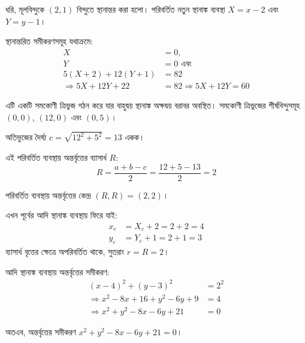\documentclass[12pt, a4paper]{article}
\begin{document}
\begin{tcolorbox}[solutionbox={সমাধান (Solution)}]
    \noindent
    ধরি, মূলবিন্দুকে $(2, 1)$ বিন্দুতে স্থানান্তর করা হলো। পরিবর্তিত নতুন স্থানাঙ্ক ব্যবস্থা $X = x - 2$ এবং $Y = y - 1$। 
    
    \vspace{0.5em}
    স্থানান্তরিত সমীকরণসমূহ যথাক্রমে: 
    \begin{align*}
        X &= 0, \\
        Y &= 0 \text{ এবং } \\
        5(X + 2) + 12(Y + 1) &= 82 \\
        \Rightarrow 5X + 12Y + 22 &= 82 \Rightarrow 5X + 12Y = 60
    \end{align*}
    
    \vspace{0.5em}
    এটি একটি সমকোণী ত্রিভুজ গঠন করে যার বাহুদ্বয় স্থানাঙ্ক অক্ষদ্বয় বরাবর অবস্থিত। সমকোণী ত্রিভুজের শীর্ষবিন্দুসমূহ $(0, 0)$, $(12, 0)$ এবং $(0, 5)$।
    
    \vspace{0.5em}
    অতিভুজের দৈর্ঘ্য $c = \sqrt{12^2 + 5^2} = 13$ একক।
    
    \vspace{0.5em}
    এই পরিবর্তিত ব্যবস্থায় অন্তর্বৃত্তের ব্যাসার্ধ $R$:
    \[ R = \frac{a + b - c}{2} = \frac{12 + 5 - 13}{2} = 2 \]
    
    \vspace{0.5em}
    পরিবর্তিত ব্যবস্থায় অন্তর্বৃত্তের কেন্দ্র $(R, R) = (2, 2)$। 
    
    \vspace{0.5em}
    এখন পূর্বের আদি স্থানাঙ্ক ব্যবস্থায় ফিরে যাই:
    \begin{align*}
        x_c &= X_c + 2 = 2 + 2 = 4 \\
        y_c &= Y_c + 1 = 2 + 1 = 3
    \end{align*}
    ব্যাসার্ধ বৃত্তের ক্ষেত্রে অপরিবর্তিত থাকে, সুতরাং $r = R = 2$।
    
    \vspace{0.5em}
    আদি স্থানাঙ্ক ব্যবস্থায় অন্তর্বৃত্তের সমীকরণ:
    \begin{align*}
        (x - 4)^2 + (y - 3)^2 &= 2^2 \\
        \Rightarrow x^2 - 8x + 16 + y^2 - 6y + 9 &= 4 \\
        \Rightarrow x^2 + y^2 - 8x - 6y + 21 &= 0
    \end{align*}
    
    \vspace{0.5em}
    অতএব, অন্তর্বৃত্তের সমীকরণ $x^2 + y^2 - 8x - 6y + 21 = 0$।
\end{tcolorbox}
\end{document}
